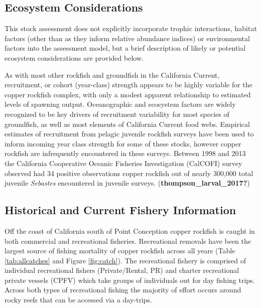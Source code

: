 \documentclass[11pt,
  english,
  letterpaper,
]{article}
\begin{document}
\hypertarget{ecosystem-considerations-1}{%
\subsection{Ecosystem Considerations}\label{ecosystem-considerations-1}}

This stock assessment does not explicitly incorporate trophic interactions, habitat factors (other than as they inform relative abundance indices) or environmental factors into the assessment model, but a brief description of likely or potential ecosystem considerations are provided below.

As with most other rockfish and groundfish in the California Current, recruitment, or cohort (year-class) strength appears to be highly variable for the copper rockfish complex, with only a modest apparent relationship to estimated levels of spawning output. Oceanographic and ecosystem factors are widely recognized to be key drivers of recruitment variability for most species of groundfish, as well as most elements of California Current food webs. Empirical estimates of recruitment from pelagic juvenile rockfish surveys have been used to inform incoming year class strength for some of these stocks, however copper rockfish are infrequently encountered in these surveys. Between 1998 and 2013 the California Cooperative Oceanic Fisheries Investigation (CalCOFI) survey observed had 34 positive observations copper rockfish out of nearly 300,000 total juvenile \emph{Sebastes} encountered in juvenile surveys. (\textbf{thompson\_larval\_2017?})

\hypertarget{historical-and-current-fishery-information}{%
\subsection{Historical and Current Fishery Information}\label{historical-and-current-fishery-information}}

Off the coast of California south of Point Conception copper rockfish is caught in both commercial and recreational fisheries. Recreational removals have been the largest source of fishing mortality of copper rockfish across all years (Table \ref{tab:allcatches} and Figure \ref{fig:catch}). The recreational fishery is comprised of individual recreational fishers (Private/Rental, PR) and charter recreational private vessels (CPFV) which take groups of individuals out for day fishing trips. Across both types of recreational fishing the majority of effort occurs around rocky reefs that can be accessed via a day-trips.
\end{document}

